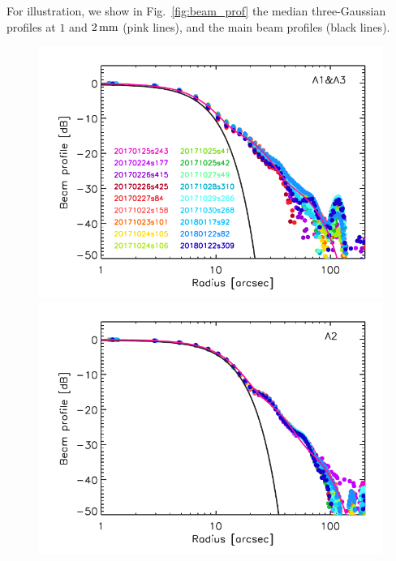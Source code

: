 {\lp For illustration, we show in
Fig.~\ref{fig:beam_prof} the median 
three-Gaussian profiles at $1$ and $2\,\rm{mm}$ (pink lines), and
the main beam profiles (black lines). }


\begin{figure}[!thbp]
  \centering
   \includegraphics[clip, width=\linewidth]{Figures/plot_profiles_dB_1mm.pdf}
   \includegraphics[clip, width=\linewidth]{Figures/plot_profiles_dB_a2.pdf}

\end{figure}
